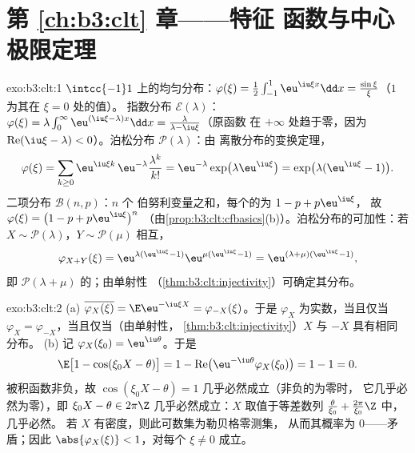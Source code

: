 \section*{第 \ref{ch:b3:clt} 章——特征
函数与中心极限定理}

\begin{solution}{exo:b3:clt:1}
$\intcc{-1}1$ 上的均匀分布：$\varphi(\xi) =
\frac12\int_{-1}^1\eu^{\iu\xi x}\dd x =
\frac{\sin\xi}{\xi}$（$1$ 为其在 $\xi = 0$ 处的值）。
指数分布 $\mathcal E(\lambda)$：$\varphi(\xi) =
\lambda\int_0^\infty\eu^{(\iu\xi - \lambda)x}\dd x =
\frac{\lambda}{\lambda - \iu\xi}$（原函数
在 $+\infty$ 处趋于零，因为 $\operatorname{Re}(\iu\xi -
\lambda) < 0$）。泊松分布 $\mathcal P(\lambda)$：由
离散分布的变换定理，
\[
\varphi(\xi) = \sum_{k\geq0}\eu^{\iu\xi
k}\,\eu^{-\lambda}\frac{\lambda^k}{k!}
= \eu^{-\lambda}\exp\bigl(\lambda\eu^{\iu\xi}\bigr)
= \exp\bigl(\lambda(\eu^{\iu\xi} - 1)\bigr).
\]
二项分布 $\mathcal B(n, p)$：$n$ 个
伯努利变量之和，每个的为 $1 - p + p\eu^{\iu\xi}$，
故 $\varphi(\xi) = \bigl(1 - p + p\eu^{\iu\xi}\bigr)^n$
（由\cref{prop:b3:clt:cfbasics}(b)）。泊松分布的可加性：若 $X
\sim \mathcal P(\lambda)$，$Y \sim \mathcal P(\mu)$
相互，
\[
\varphi_{X+Y}(\xi) = \eu^{\lambda(\eu^{\iu\xi}-1)}
\eu^{\mu(\eu^{\iu\xi}-1)} =
\eu^{(\lambda+\mu)(\eu^{\iu\xi}-1)},
\]
即 $\mathcal P(\lambda + \mu)$ 的；由单射性
（\cref{thm:b3:clt:injectivity}）可确定其分布。
\end{solution}

\begin{solution}{exo:b3:clt:2}
(a) $\overline{\varphi_X(\xi)} = \E\eu^{-\iu\xi X} =
\varphi_{-X}(\xi)$。于是 $\varphi_X$ 为实数，当且仅当
$\varphi_X = \varphi_{-X}$，当且仅当（由单射性，
\cref{thm:b3:clt:injectivity}）$X$ 与 $-X$ 具有相同
分布。
(b) 记 $\varphi_X(\xi_0) = \eu^{\iu\theta}$。于是
\[
\E\bigl[1 - \cos(\xi_0X - \theta)\bigr]
= 1 - \operatorname{Re}\bigl(\eu^{-\iu\theta}
\varphi_X(\xi_0)\bigr) = 1 - 1 = 0 .
\]
被积函数非负，故 $\cos(\xi_0X - \theta) = 1$
几乎必然成立（非负的为零时，
它几乎必然为零），即 $\xi_0X - \theta \in 2\pi\Z$ 几乎必然成立：$X$
取值于等差数列
$\frac{\theta}{\xi_0} + \frac{2\pi}{\xi_0}\Z$ 中，几乎必然。
若 $X$ 有密度，则此可数集为勒贝格零测集，
从而其概率为 $0$——矛盾；因此
$\abs{\varphi_X(\xi)} < 1$，对每个 $\xi \neq 0$ 成立。
\end{solution}

